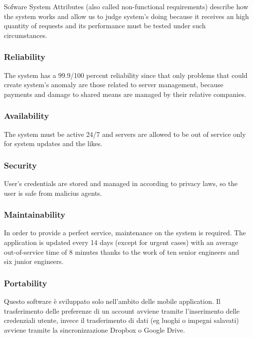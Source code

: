 Sofware System Attributes (also called non-functional requirements) describe how the system works and allow us to judge system's doing because it receives an high quantity of requests and its performance must be tested under such circumstances.

\subsubsection{Reliability}
The system has a 99.9/100 percent reliability since that only problems that could create system's anomaly are those related to server management, because payments and damage to shared means are managed by their relative companies.

\subsubsection{Availability}
The system must be active 24/7 and servers are allowed to be out of service only for system updates and the likes.

\subsubsection{Security}
User's credentials are stored and managed in according to privacy laws, so the user is safe from malicius agents.

\subsubsection{Maintainability}
In order to provide a perfect service, maintenance on the system is required. The application is updated every 14 days (except for urgent cases) with an average out-of-service time of 8 minutes thanks to the work of ten senior engineers and six junior engineers.

\subsubsection{Portability}
Questo software è sviluppato solo nell'ambito delle mobile application. Il trasferimento delle preferenze di un account avviene tramite l'inserimento delle credenziali utente, invece il trasferimento di dati (eg luoghi o impegni salavati) avviene tramite la sincronizzazione Dropbox o Google Drive.

